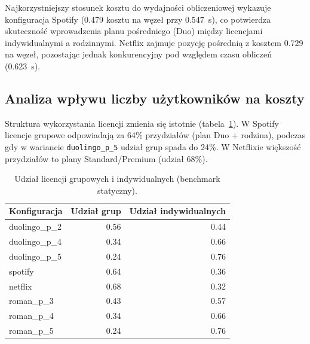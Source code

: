 Najkorzystniejszy stosunek kosztu do wydajności obliczeniowej wykazuje konfiguracja Spotify (0.479 kosztu na węzeł przy \SI{0.547}{\second}), co potwierdza skuteczność wprowadzenia planu pośredniego (Duo) między licencjami indywidualnymi a rodzinnymi. Netflix zajmuje pozycję pośrednią z kosztem 0.729 na węzeł, pozostając jednak konkurencyjny pod względem czasu obliczeń (\SI{0.623}{\second}).

\subsection{Analiza wpływu liczby użytkowników na koszty}

Struktura wykorzystania licencji zmienia się istotnie (tabela~\ref{tab:ext-license-mix}). W Spotify licencje grupowe odpowiadają za 64\% przydziałów (plan Duo + rodzina), podczas gdy w wariancie \texttt{duolingo\_p\_5} udział grup spada do 24\%. W Netflixie większość przydziałów to plany Standard/Premium (udział 68\%).

\begin{table}[H]
    \centering
    \caption{Udział licencji grupowych i indywidualnych (benchmark statyczny).}
    \label{tab:ext-license-mix}
    \begin{tabular}{lrr}
        \toprule
        \textbf{Konfiguracja} & \textbf{Udział grup} & \textbf{Udział indywidualnych} \\
        \midrule
        duolingo\_p\_2        & 0.56                 & 0.44                           \\
        duolingo\_p\_4        & 0.34                 & 0.66                           \\
        duolingo\_p\_5        & 0.24                 & 0.76                           \\
        spotify               & 0.64                 & 0.36                           \\
        netflix               & 0.68                 & 0.32                           \\
        roman\_p\_3           & 0.43                 & 0.57                           \\
        roman\_p\_4           & 0.34                 & 0.66                           \\
        roman\_p\_5           & 0.24                 & 0.76                           \\
        \bottomrule
    \end{tabular}
\end{table}


